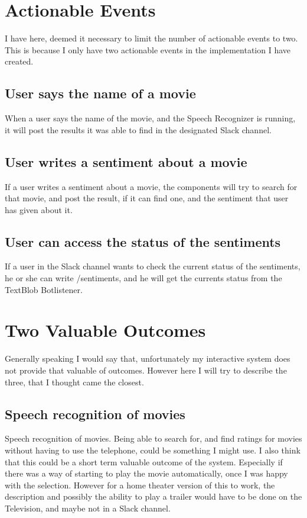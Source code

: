 \documentclass[11pt,fleqn]{book} %
\begin{document}
\chapter{Actionable Events}
I have here, deemed it necessary to limit the number of actionable events to two. This is because I only have two actionable events in the implementation I have created.
\section{User says the name of a movie}
When a user says the name of the movie, and the Speech Recognizer is running, it will post the results it was able to find in the designated Slack channel.

\section{User writes a sentiment about a movie}
If a user writes a sentiment about a movie, the components will try to search for that movie, and post the result, if it can find one, and the sentiment that user has given about it.

\section{User can access the status of the sentiments}
If a user in the Slack channel wants to check the current status of the sentiments, he or she can write /sentiments, and he will get the currents status from the TextBlob Botlistener.




\chapter{Two Valuable Outcomes}
Generally speaking I would say that, unfortunately my interactive system does not provide that valuable of outcomes.
However here I will try to describe the three, that I thought came the closest.

\section{Speech recognition of movies}
Speech recognition of movies. Being able to search for, and find ratings for movies without having to use the telephone, could be something I might use.
I also think that this could be a short term valuable outcome of the system. Especially if there was a way of starting to play the movie automatically, once I was happy with the selection. However for a home theater version of this to work, the description and possibly the ability to play a trailer would have to be done on the Television, and maybe not in a Slack channel.
\end{document}
